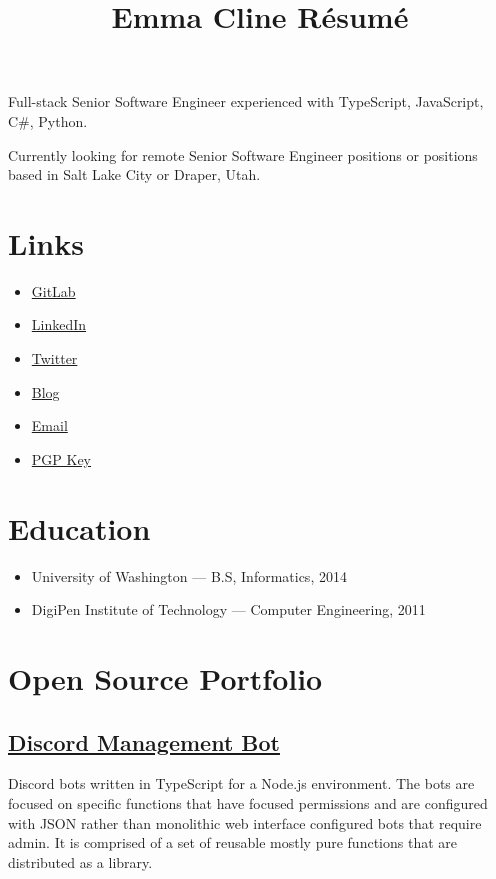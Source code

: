 \documentclass[11pt]{amsart}
\title{Emma Cline Résumé}
\author{}
\date{}
\begin{document}
\maketitle
Full-stack Senior Software Engineer experienced with TypeScript, JavaScript, C#, Python.


Currently looking for remote Senior Software Engineer positions or positions based in Salt Lake City or Draper, Utah.


\hypertarget{x-links}{\section*{Links}}
\begin{itemize}

\item \href{https://gitlab.com/EmmaJCline}{GitLab}

\item \href{https://www.linkedin.com/in/EmmaJCline}{LinkedIn}

\item \href{https://twitter.com/EmmaJCline}{Twitter}

\item \href{https://emma.cline.engineer/blog}{Blog}

\item \href{mailto:emma@cline.engineer}{Email}

\item \href{https://emma.cline.engineer/keys/publickey.emma@cline.engineer.asc}{PGP Key}

\end{itemize}


\hypertarget{x-education}{\section*{Education}}
\begin{itemize}

\item University of Washington — B.S, Informatics, 2014

\item DigiPen Institute of Technology — Computer Engineering, 2011

\end{itemize}


\hypertarget{x-open-source-portfolio}{\section*{Open Source Portfolio}}
\hypertarget{x-\href{https://gitlab.com/emmajcline/discord-mgmt-bot}{discord-management-bot}}{\subsection*{\href{https://gitlab.com/EmmaJCline/discord-mgmt-bot}{Discord Management Bot}}}
Discord bots written in TypeScript for a Node.js environment. The bots are focused on specific functions that have focused permissions and are configured with JSON rather than monolithic web interface configured bots that require admin. It is comprised of a set of reusable mostly pure functions that are distributed as a library.
\end{document}
